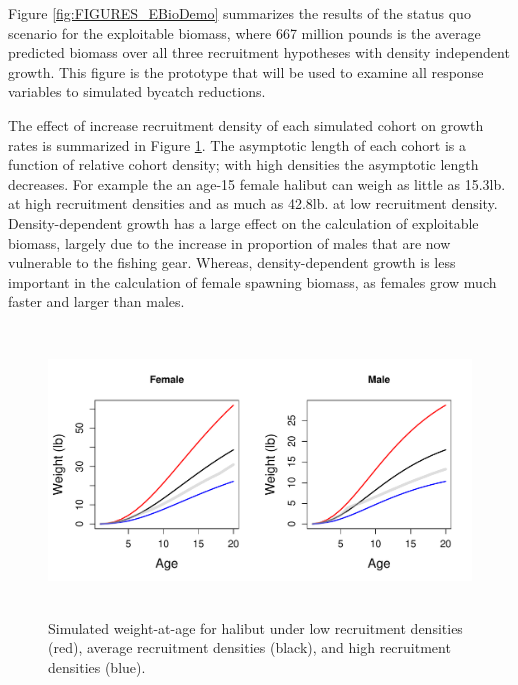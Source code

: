 Figure \ref{fig:FIGURES_EBioDemo} summarizes the results of the status quo scenario for the exploitable biomass, where 667 million pounds is the average predicted biomass over all three recruitment hypotheses with density independent growth. This figure is the prototype that will be used to examine all response variables to simulated bycatch reductions.

The effect of increase recruitment density of each simulated cohort on growth rates is summarized in Figure \ref{fig:FIGURES_fig:growth}.  The asymptotic length of each cohort is a function of relative cohort density; with high densities the asymptotic length decreases.   For example the an age-15 female halibut can weigh as little as 15.3lb. at high recruitment densities and as much as 42.8lb. at low recruitment density.  Density-dependent growth has a large effect on the calculation of exploitable biomass, largely due to the increase in proportion of males that are now vulnerable to the fishing gear.  Whereas, density-dependent growth is less important in the calculation of female spawning biomass, as females grow much faster and larger than males.

\begin{figure}[htbp]
	\centering
		\includegraphics[height=3in]{../FIGURES/fig:growth.pdf}
	\caption{Simulated weight-at-age for halibut under low recruitment densities (red), average recruitment densities (black), and high recruitment densities (blue).}
	\label{fig:FIGURES_fig:growth}
\end{figure}



